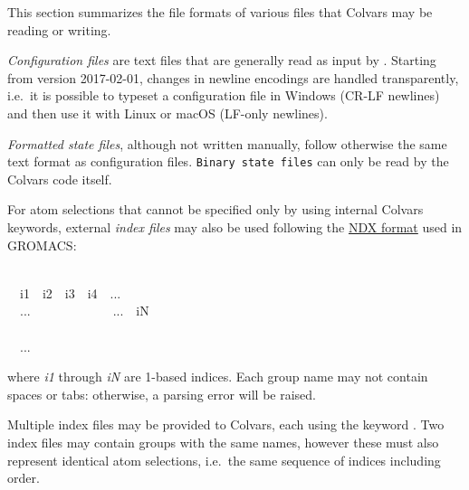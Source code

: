 


This section summarizes the file formats of various files that Colvars may be reading or writing.


\emph{Configuration files} are text files that are generally read as input by \MDENGINE{}.
Starting from version 2017-02-01, changes in newline encodings are handled transparently, i.e.\ it is possible to typeset a configuration file in Windows (CR-LF newlines) and then use it with Linux or macOS (LF-only newlines).

\emph{Formatted state files}, although not written manually, follow otherwise the same text format as configuration files.  \texttt{Binary state files} can only be read by the Colvars code itself.



For atom selections that cannot be specified only by using internal Colvars keywords, external \emph{index files} may also be used following the \href{http://manual.gromacs.org/documentation/current/reference-manual/file-formats.html\#ndx}{NDX format} used in GROMACS:
\begin{datafileexample}
\\
\-~~i1~~i2~~i3~~i4~~...\\
\-~~...~~~~~~~~~~~~~...~~iN\\
\\
\-~~...
\end{datafileexample}
\noindent{}where \emph{i1} through \emph{iN} are 1-based indices.  Each group name may not contain spaces or tabs: otherwise, a parsing error will be raised.

Multiple index files may be provided to Colvars, each using the keyword .  Two index files may contain groups with the same names, however these must also represent identical atom selections, i.e.\ the same sequence of indices including order.


